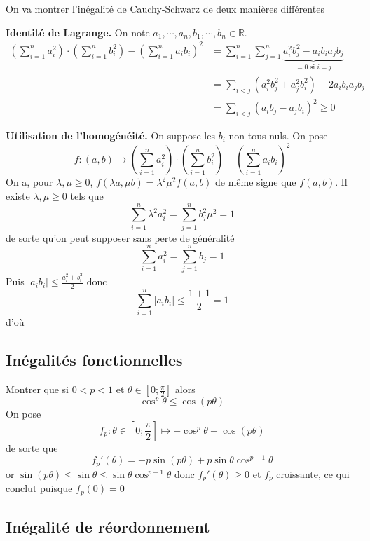 
On va montrer l'inégalité de Cauchy-Schwarz de deux manières différentes


\textbf{Identité de Lagrange.} On note $a_1, \cdots, a_n, b_1, \cdots, b_n\in\mathbb R$. \begin{align*}
        \left( \sum_{i=1}^na_i^2 \right) \cdot \left( \sum_{i=1}^n b_i^2 \right)- \left( \sum_{i=1}^na_ib_i \right)^2 &= \sum_{i=1}^n\sum_{j=1}^n \underbrace{a_i^2b_j^2-a_ib_ia_jb_j}_{=0\text{ si }i=j} \\
                                                                                                                      &= \sum_{i<j}(a_i^2b_j^2+a_j^2b_i^2)-2a_ib_ia_jb_j \\ 
                                                                                                                      &= \sum_{i<j}(a_ib_j-a_jb_i)^2\geq 0
    \end{align*}

\textbf{Utilisation de l'homogénéité.} On suppose les $b_i$ non tous nuls. On pose \[
    f:(a, b)\longrightarrow \left( \sum_{i=1}^na_i^2 \right) \cdot \left( \sum_{i=1}^n b_i^2 \right)- \left( \sum_{i=1}^na_ib_i \right)^2
\]
On a, pour $\lambda, \mu\geq 0$, $f(\lambda a, \mu b)=\lambda^2\mu^2f(a, b)$ de même signe que $f(a, b)$. Il existe $\lambda, \mu\geq 0$ tels que \[
    \sum_{i=1}^n \lambda^2a_i^2=\sum_{j=1}^nb_j^2\mu^2=1
\]
de sorte qu'on peut supposer sans perte de généralité \[
    \sum_{i=1}^na_i^2=\sum_{j=1}^n b_j=1
\]
Puis $|a_ib_i|\leq \frac{a_i^2+b_i^2}2$ donc \[
    \sum_{i=1}^n|a_ib_i|\leq \frac{1+1}2=1
\]
d'où \conc

\subsection{Inégalités fonctionnelles}

Montrer que si $0<p<1$ et $\theta\in \left[ 0; \frac\pi2 \right]$ alors \[
    \cos^p\theta\leq \cos(p\theta)
\]
On pose \[
    f_p:\theta\in \left[ 0;\frac\pi2 \right]\longmapsto -\cos^p\theta+\cos(p\theta)
\]
de sorte que \[
    f_p'(\theta)=-p\sin(p\theta)+p\sin\theta\cos^{p-1}\theta
\]
or $\sin(p\theta)\leq \sin\theta\leq \sin\theta\cos^{p-1}\theta$ donc $f_p'(\theta)\geq 0$ et $f_p$ croissante, ce qui conclut puisque $f_p(0)=0$

\subsection{Inégalité de réordonnement}

